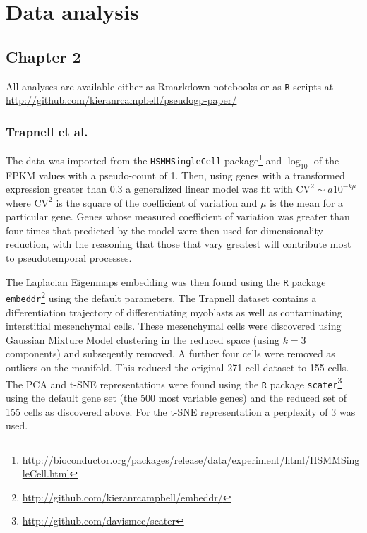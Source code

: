 \chapter{Data analysis}

\section{Chapter 2} \label{app:pseudogp_data_analysis}

All analyses are available either as Rmarkdown notebooks or as \texttt{R} scripts at \url{http://github.com/kieranrcampbell/pseudogp-paper/}

\subsection{Trapnell et al.} \label{sec:trapnell_preprocessing}
The data was imported from the \texttt{HSMMSingleCell} package\footnote{\url{http://bioconductor.org/packages/release/data/experiment/html/HSMMSingleCell.html}} and $\log_{10}$ of the FPKM values with a pseudo-count of 1. Then, using genes with a transformed expression greater than 0.3 a generalized linear model was fit with $\mathrm{CV}^2 \sim a 10^{-k\mu}$ where $\mathrm{CV}^2$ is the square of the coefficient of variation and $\mu$ is the mean for a particular gene. Genes whose measured coefficient of variation was greater than four times that predicted by the model were then used for dimensionality reduction, with the reasoning that those that vary greatest will contribute most to pseudotemporal processes.

The Laplacian Eigenmaps embedding was then found using the \texttt{R} package \texttt{embeddr}\footnote{\url{http://github.com/kieranrcampbell/embeddr/}} using the default parameters. The Trapnell dataset contains a differentiation trajectory of differentiating myoblasts as well as contaminating interstitial mesenchymal cells. These mesenchymal cells were discovered using Gaussian Mixture Model clustering in the reduced space (using $k=3$ components) and subseqently removed. A further four cells were removed as outliers on the manifold. This reduced the original 271 cell dataset to 155 cells. The PCA and t-SNE representations were found using the \texttt{R} package \texttt{scater}\footnote{\url{http://github.com/davismcc/scater}} using the default gene set (the 500 most variable genes) and the reduced set of 155 cells as discovered above. For the t-SNE representation a perplexity of 3 was used.

